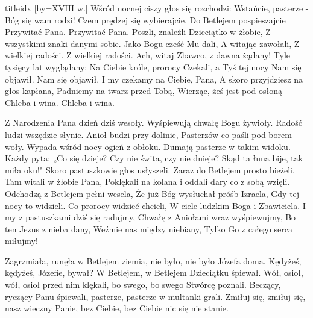 \documentclass[a5paper, portrait, 12pt]{mwart}
\begin{document}
\begin{songs}{titleidx}
\endsong
[by={XVIII w.}]
\beginverse
    Wśród nocnej ciszy głos się rozchodzi:
    Wstańcie, pasterze - Bóg się wam rodzi!
    Czem prędzej się wybierajcie,
    Do Betlejem pospieszajcie
    Przywitać Pana.
    Przywitać Pana.
\endverse
\beginverse
    Poszli, znaleźli Dzieciątko w żłobie,
    Z wszystkimi znaki danymi sobie.
    Jako Bogu cześć Mu dali,
    A witając zawołali,
    Z wielkiej radości.
    Z wielkiej radości.
\endverse
\beginverse
    Ach, witaj Zbawco, z dawna żądany!
    Tyle tysięcy lat wyglądany;
    Na Ciebie króle, prorocy
    Czekali, a Tyś tej nocy
    Nam się objawił.
    Nam się objawił.
\endverse
\beginverse
    I my czekamy na Ciebie, Pana,
    A skoro przyjdziesz na głos kapłana,
    Padniemy na twarz przed Tobą,
    Wierząc, żeś jest pod osłoną
    Chleba i wina.
    Chleba i wina.
\endverse
\endsong

\beginverse
Z Narodzenia Pana dzień dziś wesoły.
Wyśpiewują chwałę Bogu żywioły.
Radość ludzi wszędzie słynie.
Anioł budzi przy dolinie,
Pasterzów co paśli pod borem woły.
\endverse
\beginverse
Wypada wśród nocy ogień z obłoku.
Dumają pasterze w takim widoku.
Każdy pyta: „Co się dzieje?
Czy nie świta, czy nie dnieje?
Skąd ta łuna bije, tak miła oku!"
\endverse
\beginverse
Skoro pastuszkowie głos usłyszeli.
Zaraz do Betlejem prosto bieżeli.
Tam witali w żłobie Pana,
Poklękali na kolana i oddali dary co z sobą wzięli.
\endverse
\beginverse
Odchodzą z Betlejem pełni wesela,
Że już Bóg wysłuchał próśb Izraela,
Gdy tej nocy to widzieli.
Co prorocy widzieć chcieli,
W ciele ludzkim Boga i Zbawiciela.
\endverse
\beginverse
I my z pastuszkami dziś się radujmy,
Chwałę z Aniołami wraz wyśpiewujmy,
Bo ten Jezus z nieba dany,
Weźmie nas między niebiany,
Tylko Go z całego serca miłujmy!
\endverse
\endsong



\beginverse
Zagrzmiała, runęła w Betlejem ziemia,
nie było, nie było Józefa doma.
\endverse
\beginverse
Kędyżeś, kędyżeś, Józefie, bywał?
W Betlejem, w Betlejem Dzieciątku śpiewał.
\endverse
\beginverse
Wół, osioł, wół, osioł przed nim klękali,
bo swego, bo swego Stwórcę poznali.
\endverse
\beginverse
Beczący, ryczący Panu śpiewali,
pasterze, pasterze w multanki grali.
\endverse
\beginverse
Zmiłuj się, zmiłuj się, nasz wieczny Panie,
bez Ciebie, bez Ciebie nic się nie stanie.
\endverse
\endsong


\end{songs}
\end{document}
